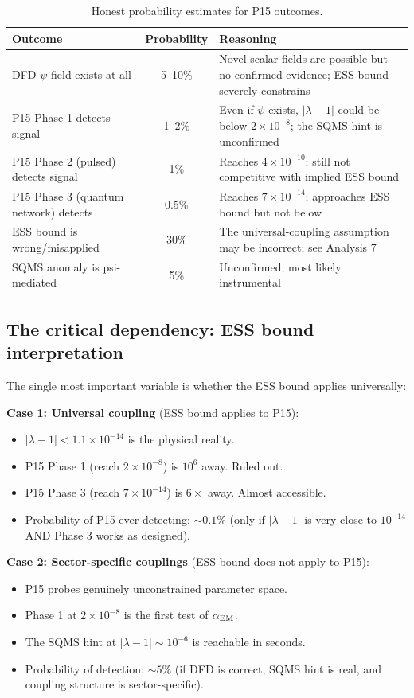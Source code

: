 \documentclass[11pt]{article}
\newcommand{\ee}[1]{\times 10^{#1}}
\newcommand{\lam}{\lambda}
\begin{document}
\begin{table}[H]
\centering
\caption{Honest probability estimates for P15 outcomes.}
\begin{tabular}{lcp{8cm}}
\toprule
Outcome & Probability & Reasoning \\
\midrule
DFD $\psi$-field exists at all & 5--10\% & Novel scalar fields are possible
but no confirmed evidence; ESS bound severely constrains \\
P15 Phase 1 detects signal & 1--2\% & Even if $\psi$ exists, $|\lam-1|$
could be below $2\ee{-8}$; the SQMS hint is unconfirmed \\
P15 Phase 2 (pulsed) detects signal & 1\% & Reaches $4\ee{-10}$; still
not competitive with implied ESS bound \\
P15 Phase 3 (quantum network) detects & 0.5\% & Reaches $7\ee{-14}$;
approaches ESS bound but not below \\
ESS bound is wrong/misapplied & 30\% & The universal-coupling
assumption may be incorrect; see Analysis 7 \\
SQMS anomaly is psi-mediated & 5\% & Unconfirmed; most likely instrumental \\
\bottomrule
\end{tabular}
\end{table}

\subsection{The critical dependency: ESS bound interpretation}

The single most important variable is whether the ESS bound applies universally:

\textbf{Case 1: Universal coupling} (ESS bound applies to P15):
\begin{itemize}
\item $|\lam-1| < 1.1\ee{-14}$ is the physical reality.
\item P15 Phase 1 (reach $2\ee{-8}$) is $10^6$ away. Ruled out.
\item P15 Phase 3 (reach $7\ee{-14}$) is $6\times$ away. Almost accessible.
\item Probability of P15 ever detecting: $\sim 0.1\%$ (only if $|\lam-1|$ is
very close to $10^{-14}$ AND Phase 3 works as designed).
\end{itemize}

\textbf{Case 2: Sector-specific couplings} (ESS bound does not apply to P15):
\begin{itemize}
\item P15 probes genuinely unconstrained parameter space.
\item Phase 1 at $2\ee{-8}$ is the first test of $\alpha_{\rm EM}$.
\item The SQMS hint at $|\lam-1| \sim 10^{-6}$ is reachable in seconds.
\item Probability of detection: $\sim 5\%$ (if DFD is correct, SQMS hint
is real, and coupling structure is sector-specific).
\end{itemize}
\end{document}
